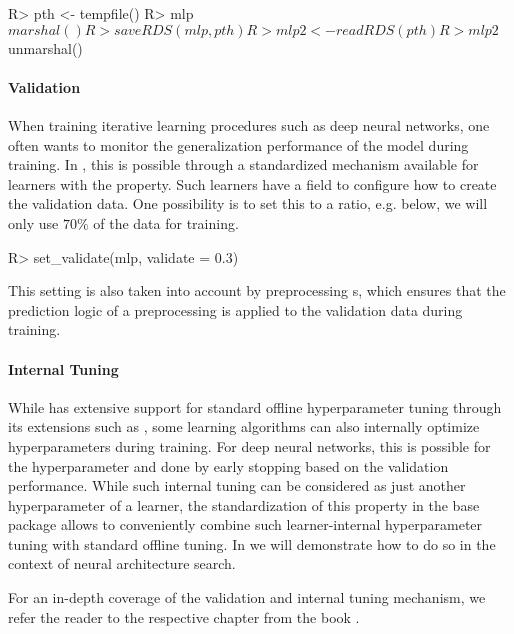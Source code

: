 \documentclass[article]{jss}
\theoremstyle{definition}
\begin{document}
\begin{CodeInput}
R> pth <- tempfile()
R> mlp$marshal()
R> saveRDS(mlp, pth)
R> mlp2 <- readRDS(pth)
R> mlp2$unmarshal()
\end{CodeInput}

\paragraph{Validation}

When training iterative learning procedures such as deep neural networks, one often wants to monitor the generalization performance of the model during training.
In \mlrt{}, this is possible through a standardized mechanism available for learners with the  property.
Such learners have a  field to configure how to create the validation data.
One possibility is to set this to a ratio, e.g. below, we will only use $70\%$ of the data for training.

\begin{CodeInput}
R> set_validate(mlp, validate = 0.3)
\end{CodeInput}

This setting is also taken into account by preprocessing s, which ensures that the prediction logic of a preprocessing  is applied to the validation data during training.

\paragraph{Internal Tuning}

While \mlrt{} has extensive support for standard offline hyperparameter tuning through its extensions such as  \citep{ref-mlr3tuning2024}, some learning algorithms can also internally optimize hyperparameters during training.
For deep neural networks, this is possible for the  hyperparameter and done by early stopping based on the validation performance.
While such internal tuning can be considered as just another hyperparameter of a learner, the standardization of this property in the \mlrt{} base package allows to conveniently combine such learner-internal hyperparameter tuning with standard offline tuning.
In  we will demonstrate how to do so in the context of neural architecture search.

For an in-depth coverage of the validation and internal tuning mechanism, we refer the reader to the respective chapter from the  book \citep{ref-mlr3book-valid}.
\end{document}
